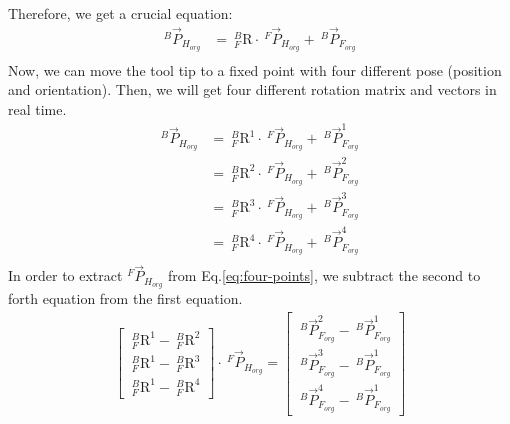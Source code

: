 Therefore, we get a crucial equation:
\begin{equation}
\begin{split}
^{B}\vec{P}_{H_{org}} &=\  _{F}^{B}\textrm{R}\cdot\ ^{F}\vec{P}_{H_{org}} +\ ^{B}\vec{P}_{F_{org}}\\
\end{split}
\end{equation}
Now, we can move the tool tip to a fixed point with four different pose (position and orientation). Then, we will get four different rotation matrix and vectors in real time. 
\begin{equation}
\begin{split}																									
^{B}\vec{P}_{H_{org}} &=\  _{F}^{B}\textrm{R}^{1}\cdot\ ^{F}\vec{P}_{H_{org}} +\ ^{B}\vec{P}_{F_{org}}^{1}\\
					  &=\  _{F}^{B}\textrm{R}^{2}\cdot\ ^{F}\vec{P}_{H_{org}} +\ ^{B}\vec{P}_{F_{org}}^{2}\\
					  &=\  _{F}^{B}\textrm{R}^{3}\cdot\ ^{F}\vec{P}_{H_{org}} +\ ^{B}\vec{P}_{F_{org}}^{3}\\
					  &=\  _{F}^{B}\textrm{R}^{4}\cdot\ ^{F}\vec{P}_{H_{org}} +\ ^{B}\vec{P}_{F_{org}}^{4}\\
\end{split}\label{eq:four-points}
\end{equation}
In order to extract $^{F}\vec{P}_{H_{org}}$ from Eq.\ref{eq:four-points}, we subtract the second to forth equation from the first equation.
\begin{equation}
\begin{split}	
\begin{bmatrix}
\  _{F}^{B}\textrm{R}^{1} - \  _{F}^{B}\textrm{R}^{2}\\ 
\  _{F}^{B}\textrm{R}^{1} - \  _{F}^{B}\textrm{R}^{3}\\ 
\  _{F}^{B}\textrm{R}^{1} - \  _{F}^{B}\textrm{R}^{4}
\end{bmatrix}
\cdot\ ^{F}\vec{P}_{H_{org}} 
=
\begin{bmatrix}
\ ^{B}\vec{P}_{F_{org}}^{2} -\ ^{B}\vec{P}_{F_{org}}^{1} \\ 
\ ^{B}\vec{P}_{F_{org}}^{3} -\ ^{B}\vec{P}_{F_{org}}^{1} \\ 
\ ^{B}\vec{P}_{F_{org}}^{4} -\ ^{B}\vec{P}_{F_{org}}^{1} 
\end{bmatrix}
\end{split}
\end{equation}
